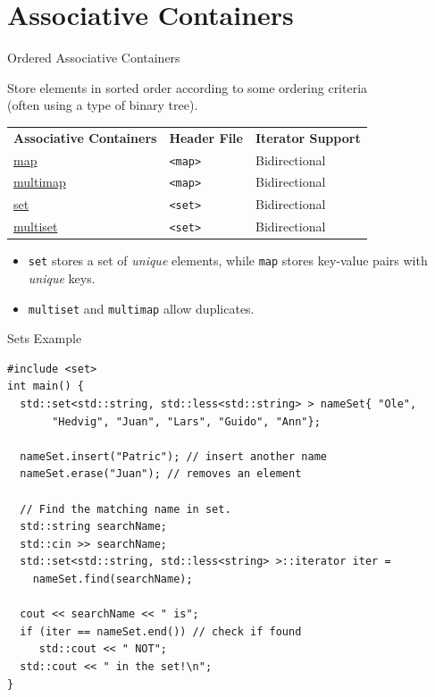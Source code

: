 \documentclass[14pt,aspectratio=1610]{beamer}
\begin{document}
\section{Associative Containers}

\begin{frame}{Ordered Associative Containers}

Store elements in sorted order according to some ordering criteria\\(often using a type of binary tree).\\[1em]

\begin{tabular}{l l l}
  \textbf{\large Associative Containers} & \textbf{Header File} & \textbf{Iterator Support}\\
  \href{https://en.cppreference.com/w/cpp/container/map}{map}
    & \lstinline{<map>} & Bidirectional\\
  \href{https://en.cppreference.com/w/cpp/container/multima}{multimap}
    & \lstinline{<map>} & Bidirectional\\
  \href{https://en.cppreference.com/w/cpp/container/set}{set}
    & \lstinline{<set>} & Bidirectional\\
  \href{https://en.cppreference.com/w/cpp/container/multiset}{multiset}
    & \lstinline{<set>} & Bidirectional\\
\end{tabular}

\begin{itemize}
\item
  \lstinline{set} stores a set of \emph{unique} elements, while \lstinline{map} stores key-value pairs with \emph{unique} keys.
\item
  \lstinline{multiset} and \lstinline{multimap} allow duplicates.
\end{itemize}

\end{frame}

\begin{frame}[fragile]{Sets Example}
\small
\begin{lstlisting}[basicstyle=\footnotesize\ttfamily]
#include <set>
int main() {
  std::set<std::string, std::less<std::string> > nameSet{ "Ole",
       "Hedvig", "Juan", "Lars", "Guido", "Ann"};

  nameSet.insert("Patric"); // insert another name
  nameSet.erase("Juan"); // removes an element

  // Find the matching name in set.
  std::string searchName;
  std::cin >> searchName;
  std::set<std::string, std::less<string> >::iterator iter =
    nameSet.find(searchName);

  cout << searchName << " is";
  if (iter == nameSet.end()) // check if found
     std::cout << " NOT";
  std::cout << " in the set!\n";
}
\end{lstlisting}
\end{frame}
\end{document}

